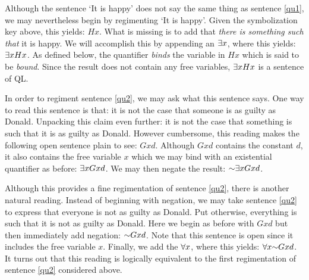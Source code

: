 Although the sentence `It is happy' does not say the same thing as sentence \ref{qu1}, we may nevertheless begin by regimenting `It is happy'.
Given the symbolization key above, this yields: $Hx$.
What is missing is to add that \textit{there is something such that} it is happy.
We will accomplish this by appending an  $\exists x$, where this yields: $\exists x Hx$.
As defined below, the quantifier \textit{binds} the variable in $Hx$ which is said to be \textit{bound}.
Since the result does not contain any free variables, $\exists x Hx$ is a sentence of QL. 

In order to regiment sentence \ref{qu2}, we may ask what this sentence says.
One way to read this sentence is that: it is not the case that someone is as guilty as Donald.
Unpacking this claim even further: it is not the case that something is such that it is as guilty as Donald.
However cumbersome, this reading makes the following open sentence plain to see: $Gxd$.
Although $Gxd$ contains the constant $d$, it also contains the free variable $x$ which we may bind with an existential quantifier as before: $\exists x Gxd$.
We may then negate the result: $\enot \qt{\exists}{x} Gxd$.

Although this provides a fine regimentation of sentence \ref{qu2}, there is another natural reading.
Instead of beginning with negation, we may take sentence \ref{qu2} to express that everyone is not as guilty as Donald.
Put otherwise, everything is such that it is not as guilty as Donald.
Here we begin as before with $Gxd$ but then immediately add negation: $\enot Gxd$.
Note that this sentence is open since it includes the free variable $x$. 
Finally, we add the  $\forall x$, where this yields: $\qt{\forall}{x} \enot Gxd$.
It turns out that this reading is logically equivalent to the first regimentation of sentence \ref{qu2} considered above.

